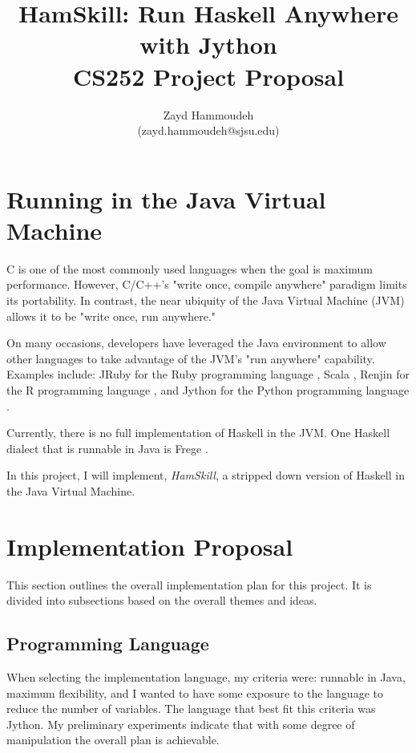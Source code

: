 \documentclass{report}
\title{HamSkill: Run Haskell Anywhere with Jython\\[1in]
	   CS252 Project Proposal}
\author{
  Zayd Hammoudeh \\
  (zayd.hammoudeh@sjsu.edu)
  }
\date{}
\begin{document}
\maketitle

\renewcommand\thesection{\arabic{section}}
\section{Running in the Java Virtual Machine}

C is one of the most commonly used languages when the goal is maximum performance.  However, C/C++'s "write once, compile anywhere" paradigm limits its portability.  In contrast, the near ubiquity of the Java Virtual Machine (JVM) allows it to be "write once, run anywhere."  

On many occasions, developers have leveraged the Java environment to allow other languages to take advantage of the JVM's "run anywhere" capability.  Examples include: JRuby for the Ruby programming language \cite{jruby}, Scala \cite{scala}, Renjin for the R programming language \cite{renjin}, and Jython for the Python programming language \cite{jython_jvm}.

Currently, there is no full implementation of Haskell in the JVM.  One Haskell dialect that is runnable in Java is Frege \cite{frege}.  

In this project, I will implement, \emph{HamSkill}, a stripped down version of Haskell in the Java Virtual Machine.

\section{Implementation Proposal}

This section outlines the overall implementation plan for this project.  It is divided into subsections based on the overall themes and ideas.  

\subsection{Programming Language}

When selecting the implementation language, my criteria were: runnable in Java, maximum flexibility, and I wanted to have some exposure to the language to reduce the number of variables.  The language that best fit this criteria was Jython.  My preliminary experiments indicate that with some degree of manipulation the overall plan is achievable.  
\end{document}
